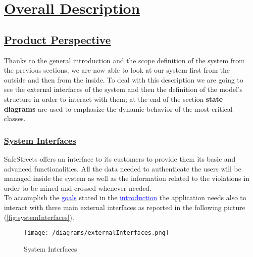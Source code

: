 \section[Overall Description]{\hyperlink{toc}{Overall Description}}

\subsection[Product Perspective]{\hyperlink{toc}{Product Perspective}}
	Thanks to the general introduction and the scope definition of the system from the previous sections, we are now able to look at our system first from the outside and then from the inside. To deal with this description we are going to see the external interfaces of the system and then the definition of the model's structure in order to interact with them; at the end of the section \textbf{state diagrams} are used to emphasize the dynamic behavior of the most critical classes.
	\subsubsection[System Interfaces]{\hyperlink{toc}{System Interfaces}}
		\label{sec:systemInterfaces}
		SafeStreets offers an interface to its customers to provide them its basic and advanced functionalities. All the data needed to authenticate the users will be managed inside the system as well as the information related to the violations in order to be mined and crossed whenever needed.\\
		
		To accomplish the \hyperref[sec:goals]{\textcolor{blue}{goals}} stated in the \hyperref[sec:introduction]{\textcolor{blue}{introduction}} the application needs also to interact with three main external interfaces as reported in the following picture (\autoref{fig:systemInterfaces}).  
		\vspace{0,3cm}
		
		\begin{figure}[h]
			\centering
			\texttt{[image: /diagrams/externalInterfaces.png]}
			\caption{\label{fig:systemInterfaces}System Interfaces}
		\end{figure}
		
